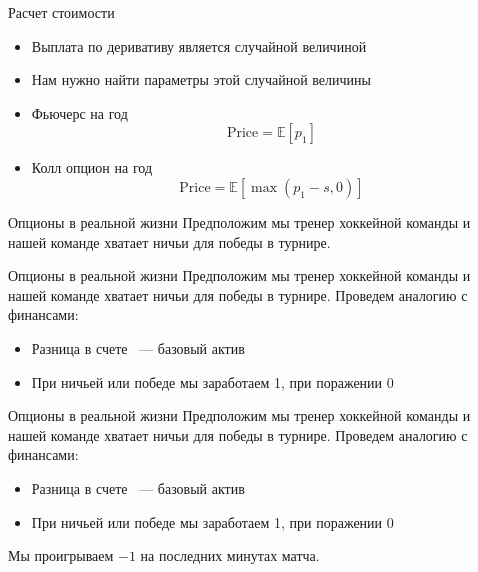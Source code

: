 \documentclass{beamer}
\newcommand{\E}{\ensuremath{\mathbb{E}}}
\begin{document}
        \begin{frame}{Расчет стоимости}
            \begin{itemize}
                \item Выплата по деривативу является случайной величиной
                \item Нам нужно найти параметры этой случайной величины
            \end{itemize}
            \begin{itemize}
                \item Фьючерс на год
                \[
                    \mathrm{Price} = \E \left[ p_1 \right]
                \]
                \item Колл опцион на год
                \[
                    \mathrm{Price} = \E \left[ \max{(p_1 - s, 0)} \right]
                \]
            \end{itemize}
        \end{frame}

        \begin{frame}{Опционы в реальной жизни}
            Предположим мы тренер хоккейной команды и нашей команде хватает ничьи для победы в турнире.
        \end{frame}

        \begin{frame}{Опционы в реальной жизни}
            Предположим мы тренер хоккейной команды и нашей команде хватает ничьи для победы в турнире.
            Проведем аналогию с финансами:
            \begin{itemize}
                \item Разница в счете ~--- базовый актив
                \item При ничьей или победе мы заработаем 1, при поражении 0
            \end{itemize}
        \end{frame}

        \begin{frame}{Опционы в реальной жизни}
            Предположим мы тренер хоккейной команды и нашей команде хватает ничьи для победы в турнире.
            Проведем аналогию с финансами:
            \begin{itemize}
                \item Разница в счете ~--- базовый актив
                \item При ничьей или победе мы заработаем 1, при поражении 0
            \end{itemize}
            Мы проигрываем $-1$ на последних минутах матча.
        \end{frame}
\end{document}
